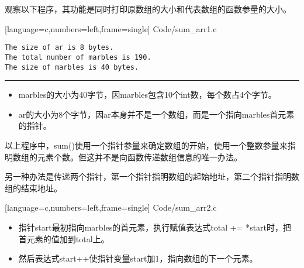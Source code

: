 \begin{frame}[fragile]\ft{\secname}
观察以下程序，其功能是同时打印原数组的大小和代表数组的函数参量的大小。
\end{frame}

\begin{frame}\ft{\secname}

[language=c,numbers=left,frame=single]
{Code/sum_arr1.c}
\end{frame}


\begin{frame}[fragile]\ft{\secname}
\begin{lstlisting}[backgroundcolor=\color{red!20}]
The size of ar is 8 bytes.
The total number of marbles is 190.
The size of marbles is 40 bytes.
\end{lstlisting}
\rule{\textwidth}{0.2mm} \pause 

\begin{itemize}
\item {\tf marbles}的大小为40字节，因{\tf marbles}包含10个{\tf int}数，每个数占4个字节。
\item {\tf ar}的大小为8个字节，因{\tf ar}本身并不是一个数组，而是一个指向{\tf marbles}首元素的指针。
\end{itemize}
\end{frame}

\begin{frame}[fragile]
以上程序中，{\tf sum()}使用一个指针参量来确定数组的开始，使用一个整数参量来指明数组的元素个数。但这并不是向函数传递数组信息的唯一办法。
\end{frame}

\begin{frame}[fragile]
另一种办法是传递两个指针，第一个指针指明数组的起始地址，第二个指针指明数组的结束地址。
\end{frame}

\begin{frame}

[language=c,numbers=left,frame=single]
{Code/sum_arr2.c}
\end{frame}


\begin{frame}[fragile]
\begin{itemize}
\item 指针{\tf start}最初指向{\tf marbles}的首元素，执行赋值表达式{\tf total += *start}时，把首元素的值加到{\tf total}上。\\[0.1in]
\item 然后表达式{\tf start++}使指针变量{\tf start}加1，\textcolor{acolor1}{指向数组的下一个元素}。
\end{itemize}
\end{frame}

